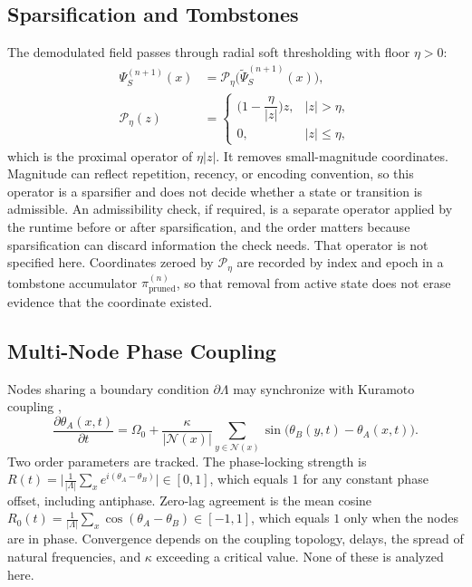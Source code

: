 \documentclass[10pt, twocolumn, a4paper]{article}
\begin{document}
\subsection{Sparsification and Tombstones}
The demodulated field passes through radial soft thresholding with floor $\eta>0$:
\begin{equation}
\begin{split}\Psi_S^{(n+1)}(x) &= \mathcal{P}_{\eta}\big(\widetilde{\Psi}_S^{(n+1)}(x)\big),\\
\mathcal{P}_{\eta}(z)&=\begin{cases}\Big(1-\dfrac{\eta}{|z|}\Big)z, & |z|>\eta,\\[6pt] 0, & |z|\le\eta,\end{cases}\end{split}
\end{equation}
which is the proximal operator of $\eta|z|$. It removes small-magnitude coordinates. Magnitude can reflect repetition, recency, or encoding convention, so this operator is a sparsifier and does not decide whether a state or transition is admissible. An admissibility check, if required, is a separate operator applied by the runtime before or after sparsification, and the order matters because sparsification can discard information the check needs. That operator is not specified here. Coordinates zeroed by $\mathcal{P}_\eta$ are recorded by index and epoch in a tombstone accumulator $\pi_{\text{pruned}}^{(n)}$, so that removal from active state does not erase evidence that the coordinate existed.

\subsection{Multi-Node Phase Coupling}
Nodes sharing a boundary condition $\partial\Lambda$ may synchronize with Kuramoto coupling \cite{kuramoto1984},
\begin{equation}
\frac{\partial \theta_A(x, t)}{\partial t} = \Omega_0 + \frac{\kappa}{|\mathcal{N}(x)|} \sum_{y \in \mathcal{N}(x)} \sin\big(\theta_B(y, t) - \theta_A(x, t)\big).
\end{equation}
Two order parameters are tracked. The phase-locking strength is $R(t)=\big|\tfrac{1}{|\Lambda|}\sum_{x}e^{i(\theta_A-\theta_B)}\big|\in[0,1]$, which equals $1$ for any constant phase offset, including antiphase. Zero-lag agreement is the mean cosine $R_0(t)=\tfrac{1}{|\Lambda|}\sum_x\cos(\theta_A-\theta_B)\in[-1,1]$, which equals $1$ only when the nodes are in phase. Convergence depends on the coupling topology, delays, the spread of natural frequencies, and $\kappa$ exceeding a critical value. None of these is analyzed here.
\end{document}
